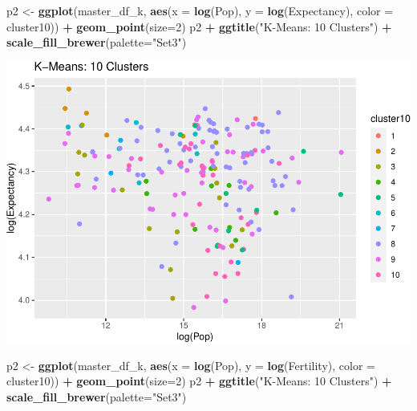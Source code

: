 \documentclass[]{article}
\newenvironment{Shaded}{\begin{snugshade}}{\end{snugshade}}
\newcommand{\DataTypeTok}[1]{\textcolor[rgb]{0.13,0.29,0.53}{#1}}
\newcommand{\DecValTok}[1]{\textcolor[rgb]{0.00,0.00,0.81}{#1}}
\newcommand{\KeywordTok}[1]{\textcolor[rgb]{0.13,0.29,0.53}{\textbf{#1}}}
\newcommand{\NormalTok}[1]{#1}
\newcommand{\OperatorTok}[1]{\textcolor[rgb]{0.81,0.36,0.00}{\textbf{#1}}}
\newcommand{\StringTok}[1]{\textcolor[rgb]{0.31,0.60,0.02}{#1}}
\begin{document}
\begin{Shaded}
\begin{Highlighting}[]
\NormalTok{p2 <-}\StringTok{ }\KeywordTok{ggplot}\NormalTok{(master_df_k, }\KeywordTok{aes}\NormalTok{(}\DataTypeTok{x =} \KeywordTok{log}\NormalTok{(Pop), }\DataTypeTok{y =} \KeywordTok{log}\NormalTok{(Expectancy), }\DataTypeTok{color =}\NormalTok{ cluster10)) }\OperatorTok{+}
\StringTok{  }\KeywordTok{geom_point}\NormalTok{(}\DataTypeTok{size=}\DecValTok{2}\NormalTok{)}
\NormalTok{p2 }\OperatorTok{+}\StringTok{ }\KeywordTok{ggtitle}\NormalTok{(}\StringTok{"K-Means: 10 Clusters"}\NormalTok{) }\OperatorTok{+}\StringTok{ }\KeywordTok{scale_fill_brewer}\NormalTok{(}\DataTypeTok{palette=}\StringTok{"Set3"}\NormalTok{)}
\end{Highlighting}
\end{Shaded}

\includegraphics{eda_files/figure-latex/unnamed-chunk-30-6.pdf}

\begin{Shaded}
\begin{Highlighting}[]
\NormalTok{p2 <-}\StringTok{ }\KeywordTok{ggplot}\NormalTok{(master_df_k, }\KeywordTok{aes}\NormalTok{(}\DataTypeTok{x =} \KeywordTok{log}\NormalTok{(Pop), }\DataTypeTok{y =} \KeywordTok{log}\NormalTok{(Fertility), }\DataTypeTok{color =}\NormalTok{ cluster10)) }\OperatorTok{+}
\StringTok{  }\KeywordTok{geom_point}\NormalTok{(}\DataTypeTok{size=}\DecValTok{2}\NormalTok{)}
\NormalTok{p2 }\OperatorTok{+}\StringTok{ }\KeywordTok{ggtitle}\NormalTok{(}\StringTok{"K-Means: 10 Clusters"}\NormalTok{) }\OperatorTok{+}\StringTok{ }\KeywordTok{scale_fill_brewer}\NormalTok{(}\DataTypeTok{palette=}\StringTok{"Set3"}\NormalTok{)}
\end{Highlighting}
\end{Shaded}
\end{document}
